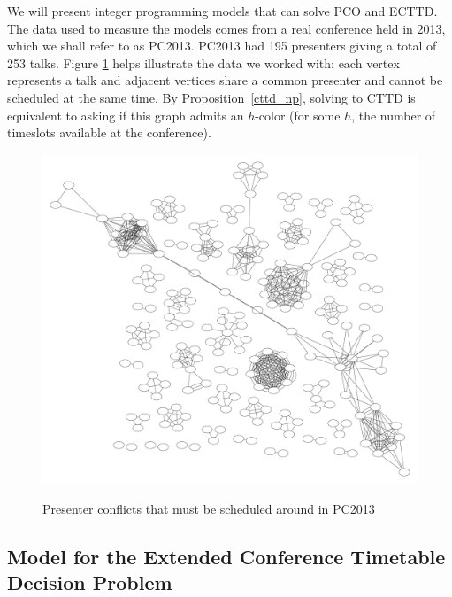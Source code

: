 \documentclass{svjour3}                     %
\begin{document}
We will present integer programming models that can solve PCO and ECTTD. 
The data used to measure the models comes from a real conference held in 2013, which we shall refer to as PC2013. 
PC2013 had 195 presenters giving a total of 253 talks. 
Figure \ref{fig_pc2013_graph} helps illustrate the data we worked with: each vertex represents a talk and adjacent vertices share a common presenter and cannot be scheduled at the same time. 
By Proposition~\ref{cttd_np}, solving to CTTD is equivalent to asking if this graph admits an $h$-color (for some $h$, the number of timeslots available at the conference).
\begin{figure}[h!]
	\caption{Presenter conflicts that must be scheduled around in PC2013}
	\centering
	\includegraphics[width=\textwidth]{penguiconconflict}
	\vspace{-.5in}
	\label{fig_pc2013_graph}
\end{figure}

\subsection{Model for the Extended Conference Timetable Decision Problem}
\end{document}
